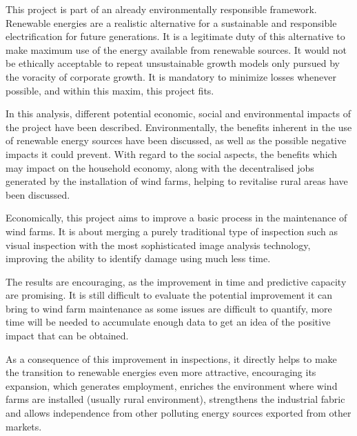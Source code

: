 This project is part of an already environmentally responsible framework. Renewable energies are a realistic alternative for a sustainable and responsible electrification for future generations. It is a legitimate duty of this alternative to make maximum use of the energy available from renewable sources. It would not be ethically acceptable to repeat unsustainable growth models only pursued by the voracity of corporate growth. It is mandatory to minimize losses whenever possible, and within this maxim, this project fits.

In this analysis, different potential economic, social and environmental impacts of the project have been described. Environmentally, the benefits inherent in the use of renewable energy sources have been discussed, as well as the possible negative impacts it could prevent. With regard to the social aspects, the benefits which may impact on the household economy, along with the decentralised jobs generated by the installation of wind farms, helping to revitalise rural areas have been discussed.

Economically, this project aims to improve a basic process in the maintenance of wind farms. It is about merging a purely traditional type of inspection such as visual inspection with the most sophisticated image analysis technology, improving the ability to identify damage using much less time.

The results are encouraging, as the improvement in time and predictive capacity are promising. It is still difficult to evaluate the potential improvement it can bring to wind farm maintenance as some issues are difficult to quantify, more time will be needed to accumulate enough data to get an idea of the positive impact that can be obtained.

As a consequence of this improvement in inspections, it directly helps to make the transition to renewable energies even more attractive, encouraging its expansion, which generates employment, enriches the environment where wind farms are installed (usually rural environment), strengthens the industrial fabric and allows independence from other polluting energy sources exported from other markets.






